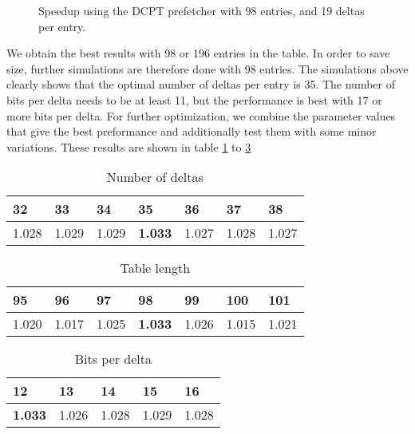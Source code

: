 \begin{figure}[h]
    \begin{centering}
        
        \caption{Speedup using the DCPT prefetcher with 98 entries, and 19 deltas per entry.}
        \label{figure:dcpt-delta-bits}
    \end{centering}
\end{figure}

We obtain the best results with 98 or 196 entries in the table. In order to save size, further simulations are therefore done with 98 entries. The simulations above clearly shows that the optimal number of deltas per entry is 35. The number of bits per delta needs to be at least 11, but the performance is best with 17 or more bits per delta. 
For further optimization, we combine the parameter values that give the best preformance and additionally test them with some minor variations. These results are shown in table \ref{tab:numdelta} to \ref{tab:deltabits}


\begin{table}[h]
\centering
\label{tab:numdelta}
\begin{tabular}{|l|l|l|l|l|l|l|}
\hline
32    & 33    & 34    & \textbf{35}    & 36    & 37    & 38    \\ \hline
1.028 & 1.029 & 1.029 & \textbf{1.033} & 1.027 & 1.028 & 1.027 \\ \hline
\end{tabular}
\smallskip
\caption{Number of deltas}
\end{table}


\begin{table}[h]
\centering
\label{tab:tablesize}
\begin{tabular}{|l|l|l|l|l|l|l|}
\hline
95    & 96    & 97    & \textbf{98}    & 99    & 100   & 101   \\ \hline
1.020 & 1.017 & 1.025 & \textbf{1.033} & 1.026 & 1.015 & 1.021 \\ \hline
\end{tabular}
\smallskip
\caption{Table length}
\end{table}


\begin{table}[h]
\centering
\label{tab:deltabits}
\begin{tabular}{|l|l|l|l|l|}
\hline
\textbf{12}    & 13    & 14    & 15    & 16    \\ \hline
\textbf{1.033} & 1.026 & 1.028 & 1.029 & 1.028 \\ \hline
\end{tabular}
\smallskip
\caption{Bits per delta}
\end{table}

